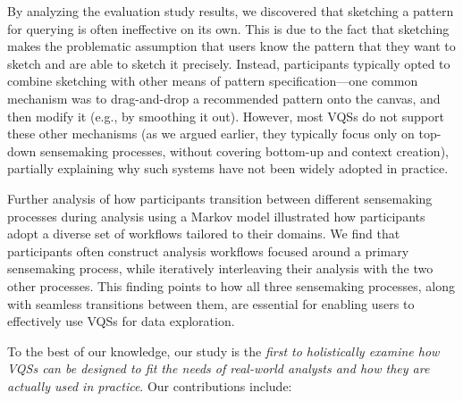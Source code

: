\par By analyzing the evaluation study results, we discovered that sketching a pattern for querying is often ineffective on its own. This is due to the fact that sketching makes the problematic assumption that users know the pattern that they want to sketch and are able to sketch it precisely. Instead, participants typically opted to combine sketching with other means of pattern specification---one common mechanism was to drag-and-drop a recommended pattern onto the canvas, and then modify it (e.g., by smoothing it out). However, most VQSs do not support these other mechanisms (as we argued earlier, they typically focus only on top-down sensemaking processes, without covering bottom-up and context creation), partially explaining why such systems have not been widely adopted in practice. %
\par Further analysis of how participants
transition between different sensemaking processes
during analysis using a Markov model illustrated
how participants adopt a diverse set of workflows tailored
to their domains. We find that participants often construct analysis workflows focused around a primary sensemaking process, while iteratively interleaving their analysis with the two other processes. This finding points to how all three sensemaking processes, along with seamless transitions between them, are essential for enabling users to effectively use VQSs for data exploration.%
\par To the best of our knowledge, our study is the \emph{first to holistically examine how VQSs can be designed to fit the needs of real-world
analysts and how they are actually used in practice}.  Our contributions include:
